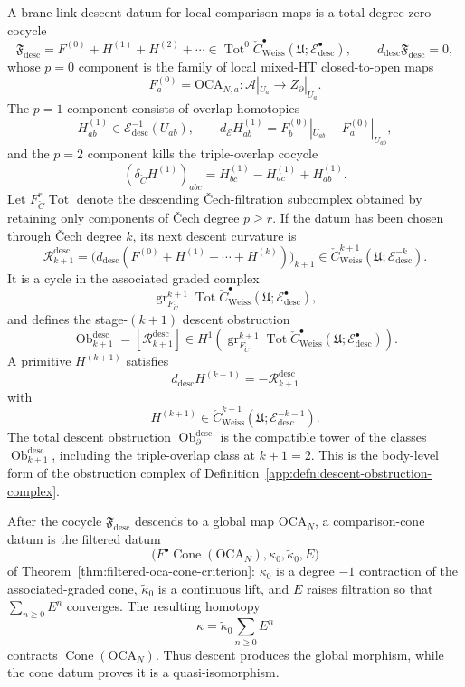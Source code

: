 \begin{defn}
A brane-link descent datum for local comparison maps is a total
degree-zero cocycle
\[
  \mathfrak F_{\mathrm{desc}}
  =
  F^{(0)}+H^{(1)}+H^{(2)}+\cdots
  \in
  \operatorname{Tot}^0\check C^\bullet_{\mathrm{Weiss}}
  (\mathfrak U;\mathcal E^\bullet_{\mathrm{desc}}),
  \qquad
  d_{\mathrm{desc}}\mathfrak F_{\mathrm{desc}}=0,
\]
whose \(p=0\) component is the family of local mixed-HT
closed-to-open maps
\[
  F^{(0)}_a=
  \mathrm{OCA}_{N,a}\colon
  \mathcal A|_{U_a}\longrightarrow Z_\partial|_{U_a}.
\]
The \(p=1\) component consists of overlap homotopies
\[
  H^{(1)}_{ab}\in
  \mathcal E^{-1}_{\mathrm{desc}}(U_{ab}),\qquad
  d_{\mathcal E}H^{(1)}_{ab}
  =
  F^{(0)}_b|_{U_{ab}}-F^{(0)}_a|_{U_{ab}},
\]
and the \(p=2\) component kills the triple-overlap cocycle
\[
  (\delta_{\check C}H^{(1)})_{abc}
  =
  H^{(1)}_{bc}-H^{(1)}_{ac}+H^{(1)}_{ab}.
\]
Let \(F^r_{\check C}\operatorname{Tot}\) denote the descending
\v{C}ech-filtration subcomplex obtained by retaining only components of
\v{C}ech degree \(p\ge r\).  If the datum has been chosen through
\v{C}ech degree \(k\), its next descent curvature is
\[
  \mathcal R^{\mathrm{desc}}_{k+1}
  =
  \bigl(d_{\mathrm{desc}}
  (F^{(0)}+H^{(1)}+\cdots+H^{(k)})\bigr)_{k+1}
  \in
  \check C^{k+1}_{\mathrm{Weiss}}
  (\mathfrak U;\mathcal E^{-k}_{\mathrm{desc}}).
\]
It is a cycle in the associated graded complex
\[
  \operatorname{gr}^{k+1}_{F_{\check C}}
  \operatorname{Tot}\check C^\bullet_{\mathrm{Weiss}}
  (\mathfrak U;\mathcal E^\bullet_{\mathrm{desc}}),
\]
and defines the stage-\((k+1)\) descent obstruction
\[
  \operatorname{Ob}^{\mathrm{desc}}_{k+1}
  =
  [\mathcal R^{\mathrm{desc}}_{k+1}]
  \in
  H^1\!\left(
  \operatorname{gr}^{k+1}_{F_{\check C}}
  \operatorname{Tot}\check C^\bullet_{\mathrm{Weiss}}
  (\mathfrak U;\mathcal E^\bullet_{\mathrm{desc}})
  \right).
\]
A primitive \(H^{(k+1)}\) satisfies
\[
  d_{\mathrm{desc}}H^{(k+1)}
  =-\mathcal R^{\mathrm{desc}}_{k+1}
\]
with
\[
  H^{(k+1)}\in
  \check C^{k+1}_{\mathrm{Weiss}}
  (\mathfrak U;\mathcal E^{-k-1}_{\mathrm{desc}}).
\]
The total descent obstruction
\(\operatorname{Ob}^{\mathrm{desc}}_{\partial}\) is the compatible tower
of the classes \(\operatorname{Ob}^{\mathrm{desc}}_{k+1}\), including
the triple-overlap class at \(k+1=2\).  This is the body-level form of
the obstruction complex of
Definition~\ref{app:defn:descent-obstruction-complex}.

After the cocycle \(\mathfrak F_{\mathrm{desc}}\) descends to a global
map \(\mathrm{OCA}_N\), a comparison-cone datum is the filtered datum
\[
  \bigl(
  F^\bullet\operatorname{Cone}(\mathrm{OCA}_N),
  \kappa_0,\widetilde\kappa_0,E
  \bigr)
\]
of Theorem~\ref{thm:filtered-oca-cone-criterion}: \(\kappa_0\) is a
degree \(-1\) contraction of the associated-graded cone,
\(\widetilde\kappa_0\) is a continuous lift, and \(E\) raises
filtration so that \(\sum_{n\ge0}E^n\) converges.  The resulting
homotopy
\[
  \kappa=\widetilde\kappa_0\sum_{n\ge0}E^n
\]
contracts \(\operatorname{Cone}(\mathrm{OCA}_N)\).  Thus descent
produces the global morphism, while the cone datum proves it is a
quasi-isomorphism.
\end{defn}

